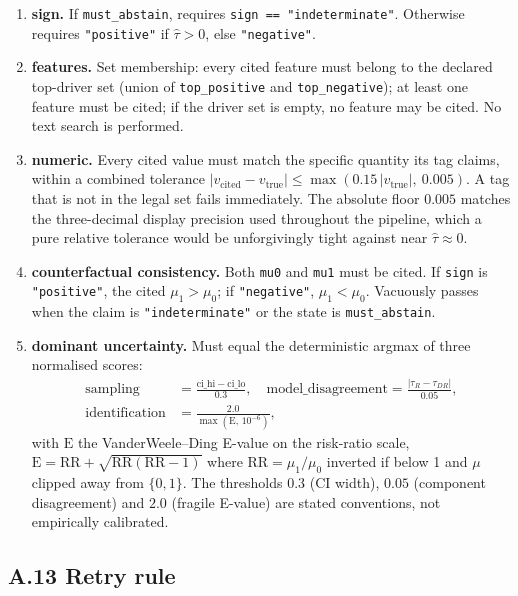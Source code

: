 \begin{enumerate}\tightlist
\item \textbf{sign.} If \texttt{must\_abstain}, requires
\texttt{sign == "indeterminate"}. Otherwise requires \texttt{"positive"} if
$\hat{\tau} > 0$, else \texttt{"negative"}.
\item \textbf{features.} Set membership: every cited feature must belong to the
declared top-driver set (union of \texttt{top\_positive} and
\texttt{top\_negative}); at least one feature must be cited; if the driver set
is empty, no feature may be cited. No text search is performed.
\item \textbf{numeric.} Every cited value must match the specific quantity its
tag claims, within a combined tolerance
$|v_{\text{cited}} - v_{\text{true}}| \le \max(0.15\,|v_{\text{true}}|,\ 0.005)$.
A tag that is not in the legal set fails immediately. The absolute floor
$0.005$ matches the three-decimal display precision used throughout the
pipeline, which a pure relative tolerance would be unforgivingly tight against
near $\hat{\tau} \approx 0$.
\item \textbf{counterfactual consistency.} Both \texttt{mu0} and \texttt{mu1}
must be cited. If \texttt{sign} is \texttt{"positive"}, the cited
$\mu_1 > \mu_0$; if \texttt{"negative"}, $\mu_1 < \mu_0$. Vacuously passes when
the claim is \texttt{"indeterminate"} or the state is \texttt{must\_abstain}.
\item \textbf{dominant uncertainty.} Must equal the deterministic argmax of
three normalised scores:
\[
\begin{aligned}
\text{sampling} &= \tfrac{\mathrm{ci\_hi}-\mathrm{ci\_lo}}{0.3}, \quad
\text{model\_disagreement} = \tfrac{|\tau_R - \tau_{DR}|}{0.05}, \\
\text{identification} &= \tfrac{2.0}{\max(\mathrm{E},\,10^{-6})},
\end{aligned}
\]
with $\mathrm{E}$ the VanderWeele--Ding E-value on the risk-ratio scale,
$\mathrm{E} = \mathrm{RR} + \sqrt{\mathrm{RR}(\mathrm{RR}-1)}$ where
$\mathrm{RR} = \mu_1/\mu_0$ inverted if below 1 and $\mu$ clipped away from
$\{0,1\}$. The thresholds $0.3$ (CI width), $0.05$ (component disagreement) and
$2.0$ (fragile E-value) are stated conventions, not empirically calibrated.
\end{enumerate}

\subsection*{A.13 Retry rule}

